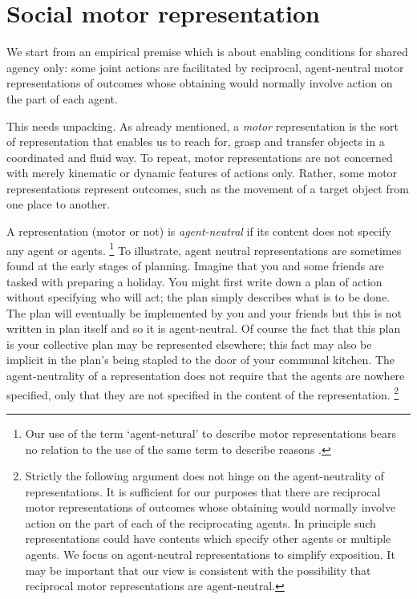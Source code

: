\documentclass[12pt,\papersize]{extarticle}
\begin{document}
\section{Social motor representation}
We start from an empirical premise which is about enabling conditions for shared agency only: some joint actions are facilitated by reciprocal, agent-neutral motor representations of outcomes whose obtaining would normally involve action on the part of each agent.

This needs unpacking. 
As already mentioned, a \textit{motor} representation is the sort of representation that enables us to reach for, grasp and transfer objects in a coordinated and fluid way.
To repeat, motor representations are not concerned with merely kinematic or dynamic features of actions only.
Rather, some motor representations represent outcomes, such as the movement of a target object from one place to another.

A representation (motor or not) is \emph{agent-neutral} if its content does not specify any agent or agents.%
\footnote{
Our use of the term `agent-netural' to describe motor representations bears no relation to the use of the same term  to describe reasons \citep[on the latter, see][]{Parfit:1984fk}.
}
To illustrate, agent neutral representations are sometimes found at the early stages of planning.
Imagine that you and some friends are tasked with preparing a holiday.  
You might first write down a plan of action without specifying who will act; the plan simply describes what is to be done.
The plan  will eventually be implemented by you and your friends
 but this is not written in plan itself  and so it is agent-neutral.
Of course the fact that this plan is your collective plan may be represented elsewhere; this fact may also be implicit in  the plan's being stapled to the door of your communal kitchen.
The agent-neutrality of a representation does not require that the agents are nowhere specified, only that they are not specified in the content of the representation.%
\footnote{
Strictly the following argument does not hinge on the agent-neutrality of representations.
It is sufficient for our purposes that there are reciprocal motor representations  of outcomes whose obtaining would normally involve action on the part of each of the reciprocating agents.
In principle such representations could have contents which specify other agents or multiple agents. 
We focus on agent-neutral representations to simplify exposition.
It may be important that our view is consistent with the possibility that reciprocal motor representations are agent-neutral. 
}
\end{document}
